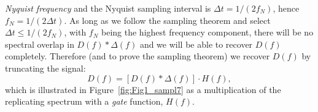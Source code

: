 \emph{Nyquist frequency} and the Nyquist sampling interval is $\Delta t  =  1/(2 f_N)$, hence $f_N = 1/(2 \Delta t)$.
As long as we follow the sampling theorem and select  $\Delta t \leq 1/(2 f_N)$, with $f_N$ being the highest 
frequency component, there will be no spectral overlap in $D(f)* \Delta (f)$ and we will be able to recover 
$D(f)$ completely.  Therefore (and to prove the sampling theorem) we recover $D(f)$ by truncating the signal:
\begin{equation}
D(f) = [ D (f) * \Delta (f) ] \cdot H(f),
\end{equation}
\noindent
which is illustrated in Figure~\ref{fig:Fig1_sampl7} as a multiplication of the replicating spectrum with a \emph{gate} function, $H(f)$.

